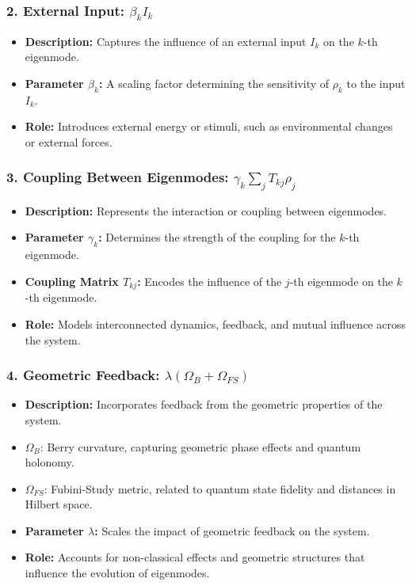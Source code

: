 \documentclass{article}
\theoremstyle{plain}
\begin{document}
\begin{itemize}
\subsubsection{2. External Input: \(\beta_k I_k\)}
\begin{itemize}
    \item \textbf{Description:} Captures the influence of an external input \(I_k\) on the \(k\)-th eigenmode.
    \item \textbf{Parameter \(\beta_k\):} A scaling factor determining the sensitivity of \(\rho_k\) to the input \(I_k\).
    \item \textbf{Role:} Introduces external energy or stimuli, such as environmental changes or external forces.
\end{itemize}

\subsubsection{3. Coupling Between Eigenmodes: \(\gamma_k \sum_j T_{kj} \rho_j\)}
\begin{itemize}
    \item \textbf{Description:} Represents the interaction or coupling between eigenmodes.
    \item \textbf{Parameter \(\gamma_k\):} Determines the strength of the coupling for the \(k\)-th eigenmode.
    \item \textbf{Coupling Matrix \(T_{kj}\):} Encodes the influence of the \(j\)-th eigenmode on the \(k\)-th eigenmode.
    \item \textbf{Role:} Models interconnected dynamics, feedback, and mutual influence across the system.
\end{itemize}

\subsubsection{4. Geometric Feedback: \(\lambda (\Omega_B + \Omega_{FS})\)}
\begin{itemize}
    \item \textbf{Description:} Incorporates feedback from the geometric properties of the system.
    \item \(\Omega_B\): Berry curvature, capturing geometric phase effects and quantum holonomy.
    \item \(\Omega_{FS}\): Fubini-Study metric, related to quantum state fidelity and distances in Hilbert space.
    \item \textbf{Parameter \(\lambda\):} Scales the impact of geometric feedback on the system.
    \item \textbf{Role:} Accounts for non-classical effects and geometric structures that influence the evolution of eigenmodes.
\end{itemize}


\end{itemize}
\end{document}

